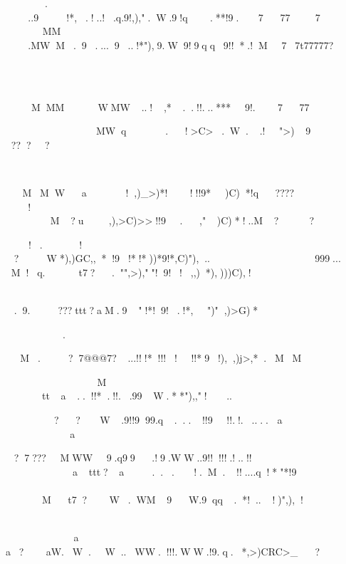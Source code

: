 .
..9!*,.!..!.q.9!,),".W.9!q.**!9.7777

		

	MM	
.MWM.9....9..!*"),9.W9!9qq9!!*.!M77t77777?
	

	




MMMWMW..!,*..!!...***9!.777



		MWq.!>C>.W..!">)9

????






MMWa!,)_>)*!!!!9*)C)*!q????


!	M?u,),>C)>>!!9.,")C)*!..M??
	

	!.
!

?W*),)GC,,*!9!*!*))*9!*,C)"),..

	
999...

M!q.t7?."",>),""!9!!,,)*),)))C),!

	


.9.???ttt?aM.9"!*!9!.!*,")",)>G)*



.	



M.?7@@@7?...!!!*!!!!!!*9!),,)j>,*.MM



		


M
tta..!!*.!!..99W.**"),,"!..
	

	



??W.9!!999.q...!!9!!.!.....
a

	a

?7???MWW9.q99.!9.WW..9!!!!!.!..!!




attt?a...!.M.!!....q!*"*!9



	

Mt7?W.WM9W.9qq.*!..!)",),!

	


a
a?aW.W.W..WW.!!!.WW.!9.q.*,>)CRC>_
?	
	
	


